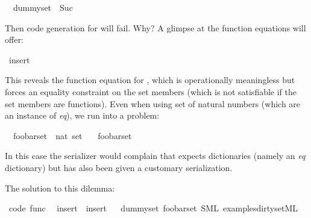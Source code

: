 \begin{isabellebody}
\ \ {\isachardoublequoteopen}dummy{\isacharunderscore}set\ {\isacharequal}\ {\isacharbraceleft}Suc{\isacharbraceright}{\isachardoublequoteclose}%
\begin{isamarkuptext}%
Then code generation for  will fail.
  Why? A glimpse at the function equations will offer:%
\end{isamarkuptext}%
\isamarkuptrue%
\isamarkupfalse%
\ {\isacharparenleft}insert{\isacharparenright}%
\begin{isamarkuptext}%
This reveals the function equation 
  for , which is operationally meaningless
  but forces an equality constraint on the set members
  (which is not satisfiable if the set members are functions).
  Even when using set of natural numbers (which are an instance
  of \emph{eq}), we run into a problem:%
\end{isamarkuptext}%
\isamarkuptrue%
\isamarkupfalse%
\isanewline
\ \ foobar{\isacharunderscore}set\ {\isacharcolon}{\isacharcolon}\ {\isachardoublequoteopen}nat\ set{\isachardoublequoteclose}\ \isanewline
\ \ {\isachardoublequoteopen}foobar{\isacharunderscore}set\ {\isacharequal}\ {\isacharbraceleft}{}{\isacharcomma}\ {}{\isacharcomma}\ {}{\isacharbraceright}{\isachardoublequoteclose}%
\begin{isamarkuptext}%
In this case the serializer would complain that 
  expects dictionaries (namely an \emph{eq} dictionary) but
  has also been given a customary serialization.

  The solution to this dilemma:%
\end{isamarkuptext}%
\isamarkuptrue%
\isamarkupfalse%
\ {\isacharbrackleft}code\ func{\isacharbrackright}{\isacharcolon}\isanewline
\ \ {\isachardoublequoteopen}insert\ {\isacharequal}\ insert{\isachardoublequoteclose}%
\isadelimproof
\ %
\endisadelimproof
%
\isatagproof
\isacommand{{\isachardot}{\isachardot}}\isamarkupfalse%
%
\endisatagproof
{\isafoldproof}%
%
\isadelimproof
%
\endisadelimproof
\isanewline
\isanewline
{}\isamarkupfalse%
\ dummy{\isacharunderscore}set\ foobar{\isacharunderscore}set\ {\isacharparenleft}SML\ {\isachardoublequoteopen}examples{\isacharslash}dirty{\isacharunderscore}set{\isachardot}ML{\isachardoublequoteclose}{\isacharparenright}%
\begin{isamarkuptext}%


\end{isamarkuptext}
\end{isabellebody}
